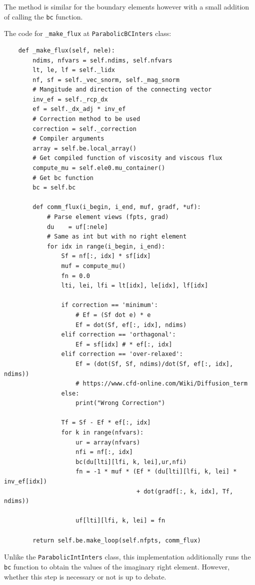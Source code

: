 \documentclass[a4paper, 12pt]{article}
\begin{document}
The method is similar for the boundary elements however with a small addition of calling the \verb|bc| function. \\\par

The code for \verb|_make_flux| at \verb|ParabolicBCInters| class:

\begin{verbatim}
    def _make_flux(self, nele):
        ndims, nfvars = self.ndims, self.nfvars
        lt, le, lf = self._lidx
        nf, sf = self._vec_snorm, self._mag_snorm
        # Mangitude and direction of the connecting vector
        inv_ef = self._rcp_dx
        ef = self._dx_adj * inv_ef
        # Correction method to be used
        correction = self._correction
        # Compiler arguments
        array = self.be.local_array()
        # Get compiled function of viscosity and viscous flux
        compute_mu = self.ele0.mu_container()
        # Get bc function 
        bc = self.bc

        def comm_flux(i_begin, i_end, muf, gradf, *uf):
            # Parse element views (fpts, grad)
            du    = uf[:nele]
            # Same as int but with no right element
            for idx in range(i_begin, i_end):
                Sf = nf[:, idx] * sf[idx]
                muf = compute_mu()
                fn = 0.0
                lti, lei, lfi = lt[idx], le[idx], lf[idx]
                
                if correction == 'minimum':
                    # Ef = (Sf dot e) * e
                    Ef = dot(Sf, ef[:, idx], ndims)
                elif correction == 'orthagonal':
                    Ef = sf[idx] # * ef[:, idx]
                elif correction == 'over-relaxed':
                    Ef = (dot(Sf, Sf, ndims)/dot(Sf, ef[:, idx], ndims))
                    # https://www.cfd-online.com/Wiki/Diffusion_term 
                else:
                    print("Wrong Correction")
                    
                Tf = Sf - Ef * ef[:, idx]
                for k in range(nfvars):
                    ur = array(nfvars)
                    nfi = nf[:, idx]
                    bc(du[lti][lfi, k, lei],ur,nfi)
                    fn = -1 * muf * (Ef * (du[lti][lfi, k, lei] * inv_ef[idx]) 
                                     + dot(gradf[:, k, idx], Tf, ndims))

                    uf[lti][lfi, k, lei] = fn
                
        return self.be.make_loop(self.nfpts, comm_flux)
\end{verbatim} 
\par
Unlike the \verb|ParabolicIntInters| class, this implementation additionally runs the \verb|bc| function to obtain the values of the imaginary right element. However, whether this step is necessary or not is up to debate.
\end{document}
